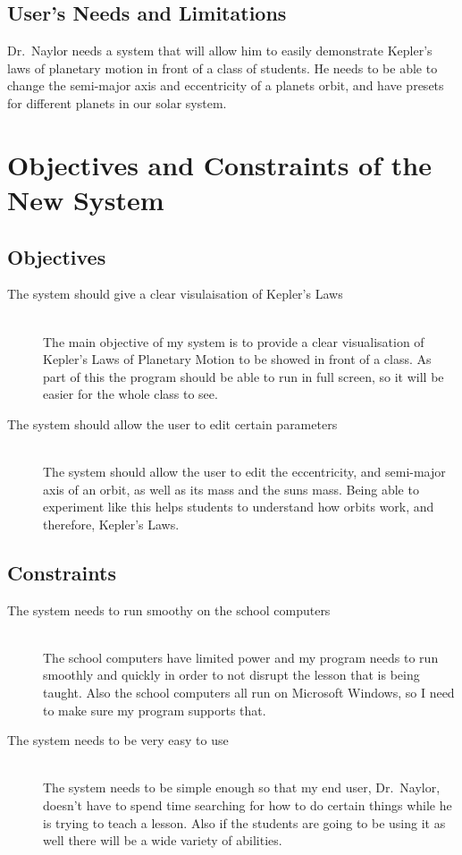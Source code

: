 \subsection{User's Needs and Limitations} 
Dr.~Naylor needs a system that will allow him to easily demonstrate Kepler's
laws of planetary motion in front of a class of students. He needs to be able
to change the semi-major axis and eccentricity of a planets orbit, and have
presets for different planets in our solar system. 

\section{Objectives and Constraints of the New System}

\subsection{Objectives}
\begin{description}
	\item[The system should give a clear visulaisation of Kepler's Laws]
		\hfill \\
		The main objective of my system is to provide a clear
		visualisation of Kepler's Laws of Planetary Motion to be showed
		in front of a class. As part of this the program should be able
		to run in full screen, so it will be easier for the whole class
		to see.
	\item[The system should allow the user to edit certain parameters] 
		\hfill \\
		The system should allow the user to edit the eccentricity, and
		semi-major axis of an orbit, as well as its mass and the suns
		mass. Being able to experiment like this helps students to
		understand how orbits work, and therefore, Kepler's Laws.

\end{description}

\subsection{Constraints}
\begin{description}
	\item[The system needs to run smoothy on the school computers]
		\hfill \\
		The school computers have limited power and my program needs to
		run smoothly and quickly in order to not disrupt the lesson that
		is being taught. Also the school computers all run on Microsoft
		Windows, so I need to make sure my program supports that. 
	\item[The system needs to be very easy to use] \hfill \\
		The system needs to be simple enough so that my end user,
		Dr.~Naylor, doesn't have to spend time searching for how to do
		certain things while he is trying to teach a lesson. Also if the
		students are going to be using it as well there will be a wide
		variety of abilities.
\end{description}

